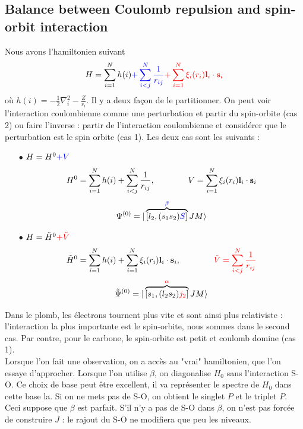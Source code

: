 \subsection{Balance between  Coulomb repulsion and spin-orbit interaction}
Nous avons l'hamiltonien suivant
\begin{equation}
H = \sum_{i=1}^N h(i)  
{ \color{blue}+ \sum_{i < j}^N \frac{1}{r_{ij}}}
{\color{red}+  \sum_{i=1}^N \xi_i(r_i) {\bf l}_i 
\cdot  {\bf s}_i }
\end{equation}
où $h(i)  = - \frac{1}{2} \nabla_i^2 -  \frac{Z}{r_i}$. Il y a deux façon de le partitionner. On 
peut voir l'interaction coulombienne comme une perturbation et partir du spin-orbite (cas 2) ou faire 
l'inverse : partir de l'interaction coulombienne et considérer que le perturbation est le spin
orbite (cas 1). Les deux cas sont les suivants :
\begin{itemize}
\item[$\bullet$] $H = H^0 {\color{blue} + V}$
\begin{equation}
H^0 = \sum_{i=1}^N h(i)  
+ \sum_{i < j}^N \frac{1}{r_{ij}},\qquad\qquad
V =  \sum_{i=1}^N \xi_i(r_i) {\bf l}_i \cdot  {\bf s}_i 
\end{equation}
\begin{equation}
\Psi^{(0)} = 
  \vert \overbrace{[ l_2, (s_1 s_2) {\color{blue} S}] }
^{{\color{blue} \beta}}
J M \rangle
\end{equation}
\item[$\bullet$] $H = \tilde{H}^0 {\color{red} + \tilde{V}}$
\begin{equation}
\tilde{H}^0 = \sum_{i=1}^N h(i)  
+  \sum_{i=1}^N \xi_i(r_i) {\bf l}_i \cdot  {\bf s}_i,\qquad\qquad
{\color{red}
\tilde{V} =  \sum_{i < j}^N \frac{1}{r_{ij}}  }
\end{equation}
\begin{equation}
\tilde{\Psi}^{(0)} = 
  \vert 
\overbrace{ [ s_1, (l_2 s_2) {\color{red} j_2} ]}
^{{\color{red} \alpha}} 
J M \rangle
\end{equation}
\end{itemize}
Dans le plomb, les électrons tournent plus vite et sont ainsi plus relativiste : l'interaction
la plus importante est le spin-orbite, nous sommes dans le second cas. Par contre, pour le carbone,
le spin-orbite est petit et coulomb domine (cas 1). \\

Lorsque l'on fait une observation, on a accès au "vrai" hamiltonien, que l'on essaye d'approcher. 
Lorsque l'on utilise $\beta$, on diagonalise $H_0$ sans l'interaction S-O. Ce choix de base peut
être excellent, il va représenter le spectre de $H_0$ dans cette base la. Si on ne mets pas de
S-O, on obtient le singlet $P$ et le triplet $P$. Ceci suppose que $\beta$ est parfait. S'il n'y a
pas de S-O dans $\beta$, on n'est pas forcée de construire $J$ : le rajout du S-O ne modifiera que
peu les niveaux.\\

